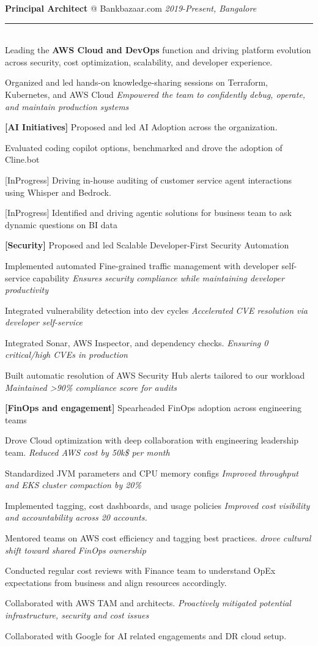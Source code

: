 \documentclass[11pt]{article}
\makeatletter
\newcommand{\roleheader}[3]{%
  {\large\sffamily\textbf{#1} @ #2} \hfill \textit{#3}\\[-0.3em]
  \color{myblue}\rule{\linewidth}{1pt}\\[0.5em]\color{bodytext}
}
\newenvironment{experiencebullets}{%
  \begin{itemize}[leftmargin=1.25em, itemsep=-0.25em]
    \renewcommand{\labelitemi}{\textbullet}
}{%
  \end{itemize}
}
\newenvironment{experience}[4]{%
  \roleheader{#1}{#2}{#3}%
  #4\vspace{0.5em}%
}{%
  \vspace{1em}
}
\newcommand{\aexpbullet}[2]{%
  \item {#1} \textrightarrow{} \textit{#2}%
}
\newcommand{\expmultibullet}[3]{%
  \item \textbf{[#1]} #2
  \begin{arrowitem}
    #3
  \end{arrowitem}
}
\makeatother
\begin{document}
\begin{experience}{Principal Architect}{Bankbazaar.com}{2019-Present, Bangalore}{%
    Leading the \textbf{AWS Cloud and DevOps} function and driving platform evolution across security, cost optimization, scalability, and developer experience.%
  }
\begin{experiencebullets}
{      \aexpbullet{Organized and led hands-on knowledge-sharing sessions on Terraform, Kubernetes, and AWS Cloud}
      {Empowered the team to confidently debug, operate, and maintain production systems}
    }

    \expmultibullet {AI Initiatives}{Proposed and led AI Adoption across the organization.}
    {
      \item {Evaluated coding copilot options, benchmarked and drove the adoption of Cline.bot}
      \item {[InProgress] Driving in-house auditing of customer service agent interactions using Whisper and Bedrock.}
      \item {[InProgress] Identified and driving agentic solutions for business team to ask dynamic questions on BI data}
    }

    \expmultibullet {Security}{Proposed and led Scalable Developer-First Security Automation}
    {
      \aexpbullet {Implemented automated Fine-grained traffic management with developer self-service capability}{Ensures security compliance while maintaining developer productivity}
      \aexpbullet {Integrated vulnerability detection into dev cycles}{Accelerated CVE resolution via developer self-service}
      \aexpbullet {Integrated Sonar, AWS Inspector, and dependency checks.}{Ensuring 0 critical/high CVEs in production}
      \aexpbullet {Built automatic resolution of AWS Security Hub alerts tailored to our workload}{Maintained >90\% compliance score for audits}
    }

    \expmultibullet {FinOps and engagement}{Spearheaded FinOps adoption across engineering teams}
    {
      \aexpbullet {Drove Cloud optimization with deep collaboration with engineering leadership team.}{Reduced AWS cost by 50k\$ per month}
      \aexpbullet {Standardized JVM parameters and CPU memory configs}{Improved throughput and EKS cluster compaction by 20\%}
      \aexpbullet {Implemented tagging, cost dashboards, and usage policies}{Improved cost visibility and accountability across 20 accounts.}
      \aexpbullet {Mentored teams on AWS cost efficiency and tagging best practices.}{drove cultural shift toward shared FinOps ownership}
      \item       {Conducted regular cost reviews with Finance team to understand OpEx expectations from business and align resources accordingly.}
      \aexpbullet {Collaborated with AWS TAM and architects.}{Proactively mitigated potential infrastructure, security and cost issues}
      \item {Collaborated with Google for AI related engagements and DR cloud setup.}
    }


\end{experiencebullets}
\end{experience}
\end{document}
